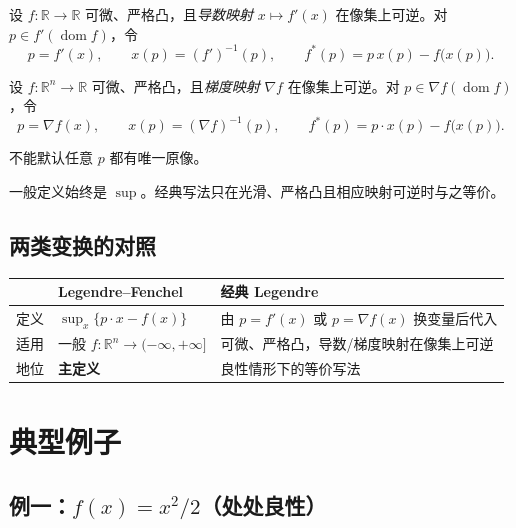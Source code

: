 \documentclass[
    lang=cn,
    color=blue,
    mode=fancy,
    thmcnt=section,
    scheme=chinese,
    chinesefont=ctexfont
]{elegantbook}
\newcommand{\R}{\mathbb{R}}
\DeclareMathOperator{\dom}{dom}
\newcommand{\fstarp}{f^{\ast}(p)}
\begin{document}
\begin{definition}[经典 Legendre 变换（一元）]
设 $f:\R\to\R$ 可微、严格凸，且\emph{导数映射} $x\mapsto f'(x)$ 在像集上可逆。对 $p\in f'(\dom f)$，令
\[
p=f'(x),\qquad
x(p)=(f')^{-1}(p),\qquad
\fstarp=p\,x(p)-f\bigl(x(p)\bigr).
\]
\end{definition}

\begin{definition}[经典 Legendre 变换（多元）]
设 $f:\R^{n}\to\R$ 可微、严格凸，且\emph{梯度映射} $\nabla f$ 在像集上可逆。对 $p\in\nabla f(\dom f)$，令
\[
p=\nabla f(x),\qquad
x(p)=(\nabla f)^{-1}(p),\qquad
\fstarp=p\cdot x(p)-f\bigl(x(p)\bigr).
\]
\end{definition}

不能默认任意 $p$ 都有唯一原像。

\begin{note}
一般定义始终是 $\sup$。经典写法只在光滑、严格凸且相应映射可逆时与之等价。
\end{note}


\section{两类变换的对照}

\begin{center}
\begin{tabular}{lll}
\toprule
 & Legendre--Fenchel & 经典 Legendre \\
\midrule
定义 & $\sup_{x}\{p\cdot x-f(x)\}$ & 由 $p=f'(x)$ 或 $p=\nabla f(x)$ 换变量后代入 \\
适用 & 一般 $f:\R^{n}\to(-\infty,+\infty]$ & 可微、严格凸，导数/梯度映射在像集上可逆 \\
地位 & \textbf{主定义} & 良性情形下的等价写法 \\
\bottomrule
\end{tabular}
\end{center}


\chapter{典型例子}

\section{\texorpdfstring{例一：$f(x)=x^{2}/2$（处处良性）}{例一：f(x)=x^2/2（处处良性）}}
\end{document}
